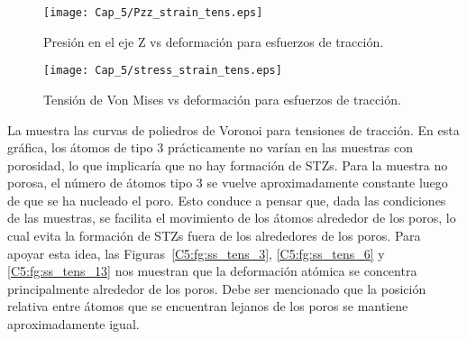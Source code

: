 \begin{figure}[H]
  \centering
	\texttt{[image: Cap\_5/Pzz\_strain\_tens.eps]}
	\caption[Presión en el eje Z vs deformación para esfuerzos de tracción]{Presión en el eje Z vs deformación para esfuerzos de tracción.}
	\label{C5:fg:PzzTens}
\end{figure}

\begin{figure}[H]
  \centering
	\texttt{[image: Cap\_5/stress\_strain\_tens.eps]}
	\caption[Tensión de Von Mises vs deformación para esfuerzos de tracción]{Tensión de Von Mises vs deformación para esfuerzos de tracción.}
	\label{C5:fg:stressTens}
  \label{C5:fg:stress}
\end{figure}

La  muestra las curvas de poliedros de Voronoi para tensiones de tracción. En esta gráfica, los átomos de tipo 3
prácticamente no varían en las muestras con porosidad, lo que implicaría que no hay formación de STZs. Para la muestra no porosa, el número de átomos tipo 3 se vuelve aproximadamente constante luego de que se ha nucleado el poro. Esto conduce a pensar que, dada las condiciones de las muestras, se facilita el movimiento de los átomos alrededor de los poros, lo cual evita la formación de STZs fuera de los alrededores de los poros. Para apoyar esta idea, las Figuras~\ref{C5:fg:ss_tens_3}, \ref{C5:fg:ss_tens_6} y \ref{C5:fg:ss_tens_13} nos muestran que la deformación atómica se concentra principalmente alrededor de los poros. Debe ser mencionado que la posición relativa entre átomos que se encuentran lejanos de los poros se mantiene aproximadamente igual.

